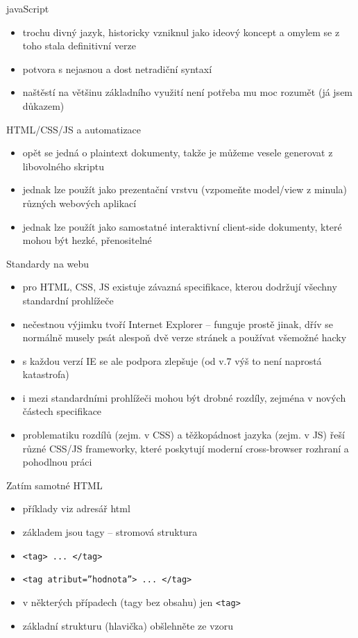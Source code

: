 \documentclass{beamer}
\begin{document}
\begin{frame}{javaScript}
  \begin{itemize}
    \item trochu divný jazyk, historicky vzniknul jako ideový koncept a omylem se z toho stala definitivní verze
    \item potvora s nejasnou a dost netradiční syntaxí
    \item naštěstí na většinu základního využití není potřeba mu moc rozumět (já jsem důkazem)
  \end{itemize}
\end{frame}

\begin{frame}{HTML/CSS/JS a automatizace}
  \begin{itemize}
    \item opět se jedná o plaintext dokumenty, takže je můžeme vesele generovat z libovolného skriptu
    \item jednak lze použít jako prezentační vrstvu (vzpomeňte model/view z minula) různých webových aplikací
    \item jednak lze použít jako samostatné interaktivní client-side dokumenty, které mohou být hezké, přenositelné
  \end{itemize}
\end{frame}

\begin{frame}{Standardy na webu}
  \begin{itemize}
    \item pro HTML, CSS, JS existuje závazná specifikace, kterou dodržují všechny standardní prohlížeče
    \item nečestnou výjimku tvoří Internet Explorer -- funguje prostě jinak, dřív se normálně musely psát alespoň dvě verze stránek a používat všemožné hacky
    \item s každou verzí IE se ale podpora zlepšuje (od v.7 výš to není naprostá katastrofa)
    \item i mezi standardními prohlížeči mohou být drobné rozdíly, zejména v nových částech specifikace
    \item problematiku rozdílů (zejm. v CSS) a těžkopádnost jazyka (zejm. v JS) řeší různé CSS/JS frameworky, které poskytují moderní cross-browser rozhraní a pohodlnou práci
  \end{itemize}
\end{frame}

\begin{frame}{Zatím samotné HTML}
  \begin{itemize}
    \item příklady viz adresář html
    \item základem jsou tagy -- stromová struktura
    \item \texttt{<tag> ... </tag>}
    \item \texttt{<tag atribut=''hodnota''> ... </tag>}
    \item v některých případech (tagy bez obsahu) jen \texttt{<tag>}
    \item základní strukturu (hlavička) obšlehněte ze vzoru
  \end{itemize}
\end{frame}
\end{document}

